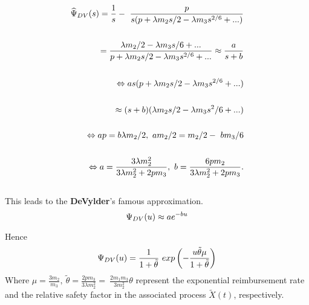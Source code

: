 \begin{equation*}
\begin{split}
\widehat{\Psi}_{DV}(s)= \frac{1}{s} - \ \frac{p}{s(p+ \lambda m_{2}s/2 -\lambda m_{3}s^{2/6}+...)} \\ \\
= \frac{\lambda m_{2}/2 - \lambda m_{3}s/6+...}{p+  \lambda m_{2}s/2 -\lambda m_{3}s^{2/6}+...}
\approx \frac{a}{s+b} \\ \\
\Leftrightarrow as( p+  \lambda m_{2}s/2 -\lambda m_{3}s^{2/6}+...) \\ \\
\approx (s+b)( \lambda m_{2}s/2 - \lambda m_{3}s^{2}/6+...) \\ \\
\Leftrightarrow ap= b \lambda m_{2}/2 , \ a m_{2}/2= m_{2}/2 - \ b m_{3}/6 \\ \\
\Leftrightarrow
a= \frac{3 \lambda m_{2}^{2}}{3 \lambda m_{2}^{2} + 2p m_{3}} , \ b= \frac{6 p m_{2}}{3 \lambda m_{2}^{2}+ 2 p m_{3}}.
\end{split}
\end{equation*} \\
This leads to the \textbf{DeVylder}'s famous approximation.
\begin{equation}
\Psi_{DV}(u) \approx a e^{-bu}
\end{equation}
\newpage

Hence
\begin{equation}
\Psi_{DV}(u) = \frac{1}{1+ \tilde{\theta}} \ exp \left( - \frac{u \tilde{\theta} \mu}{1+ \tilde{\theta}} \right)
\end{equation}
Where $ \mu =\frac{3 m_{2}}{m_{3}}, \ \tilde{\theta}= \frac{2 p m_{3}}{3 \lambda m_{2}^{2}} = \ \frac{2 m _{1} m_{3}}{3 m_{2}^{2}} \theta$ represent the exponential reimbursement rate and the relative safety factor in the associated process $\tilde{X}(t)$, respectively.



